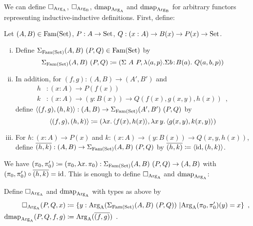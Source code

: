 \documentclass[orivec,envcountsame, ,envcountsect]{llncs}
\begin{document}
We can define $\Box_{\text{Arg}_{\text{A}}}$, $\Box_{\text{Arg}_{\text{B}}}$, $\text{dmap}_{\text{Arg}_{\text{A}}}$ and $\text{dmap}_{\text{Arg}_{\text{B}}}$ for arbitrary functors
representing inductive-inductive definitions. First, define:

\begin{definition}
    Let $(A, B) \in \text{Fam}(\text{Set})$, $P : A \to \text{Set}$, $Q : (x : A) \to B(x)
    \to P(x) \to \text{Set}$.
  \begin{enumerate}[(i)]
  \item Define $\Sigma_{\text{Fam}(\text{Set})} (A, B)\ (P, Q) \in \text{Fam}(\text{Set})$ by
 \[
\Sigma_{\text{Fam}(\text{Set})} (A, B)\ (P, Q) \coloneqq (\Sigma\ A\ P, \lambda
    \langle a, p\rangle . \Sigma b\!:\!B(a).\ Q(a, b, p))
 \]
  \item In addition, for $(f, g) : (A, B) \to (A', B')$ and
  \begin{align*}
h &: (x : A) \to P(f(x)) \\
k &: (x : A) \to (y : B(x)) \to Q(f(x), g(x, y), h(x)) \enspace ,
  \end{align*}
define $\langle(f, g), (h, k)\rangle : (A, B) \to \Sigma_{\text{Fam}(\text{Set})} (A', B')\ (P, Q)$ by
\[
\langle(f, g), (h, k)\rangle \coloneqq (\lambda x .\, \langle f(x), h(x)\rangle, \lambda x\,y .\, \langle g(x, y), k(x, y)\rangle)
\]
\item For $h : (x : A) \to P(x)$ and $ k : (x : A) \to (y : B(x)) \to
  Q(x, y, h(x))$, define $\overline{(h, k)} : (A, B) \to \Sigma_{\text{Fam}(\text{Set})} (A, B)\
  (P, Q)$ by $\overline{(h, k)} \coloneqq \langle\text{id}, (h, k)\rangle$.
  \end{enumerate}
\end{definition}
We have $(\pi_0, \pi'_0) \coloneqq (\pi_0, \lambda x .\,
\pi_0) : \Sigma_{\text{Fam}(\text{Set})} (A, B)\ (P, Q) \to (A, B)$ with $(\pi_0, \pi'_0)
\circ \overline{(h, k)} = \text{id}$. This is enough to define $\Box_{\text{Arg}_{\text{A}}}$ and $\text{dmap}_{\text{Arg}_{\text{A}}}$:

\begin{definition}
Define $\Box_{\text{Arg}_{\text{A}}}$ and $\text{dmap}_{\text{Arg}_{\text{A}}}$ with types as above by
\begin{align*}
\BOX_{\ArgA}(P, Q, x) &\coloneqq %
    \{ y : \ArgA(\SigmaFAM (A, B)\ (P, Q))\ | \ArgA(\pi_0, \pi'_0)(y) = x\} \enspace , \\
\dmap_{\ArgA}(P, Q, f, g) &\coloneqq %
    \ArgA(\CwFsect{(f, g)}) \enspace .
\end{align*}
\end{definition}
\end{document}
